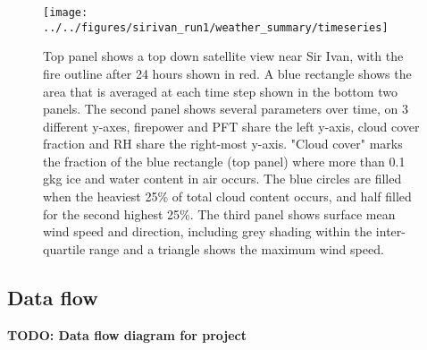     \begin{figure}
      \texttt{[image: ../../figures/sirivan\_run1/weather\_summary/timeseries]}
      \caption{%
        Top panel shows a top down satellite view near Sir Ivan, with the fire outline after 24 hours shown in red. A blue rectangle shows the area that is averaged at each time step shown in the bottom two panels.
        The second panel shows several parameters over time, on 3 different y-axes, firepower and PFT share the left y-axis, cloud cover fraction and RH share the right-most y-axis.
        "Cloud cover" marks the fraction of the blue rectangle (top panel) where more than 0.1 g\/kg ice and water content in air occurs. 
        The blue circles are filled when the heaviest 25\% of total cloud content occurs, and half filled for the second highest 25\%.
        The third panel shows surface mean wind speed and direction, including grey shading within the inter-quartile range and a triangle shows the maximum wind speed.}
      \label{fig:model:sirivan_summary_timeseries}
    \end{figure}
  
  \subsection{Data flow}
    \textbf{TODO: Data flow diagram for project}
